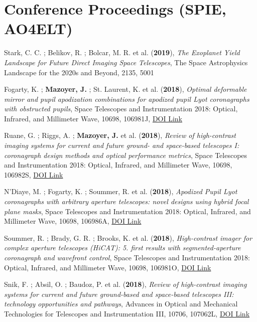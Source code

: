 \documentclass[11pt]{article}
\begin{document}
\section*{Conference Proceedings (SPIE, AO4ELT)}

\begin{etaremune}\itemsep 0pt


\item Stark, C. C. ; Belikov, R. ; Bolcar, M. R. et al. ({\bf2019}), {\it The Exoplanet Yield Landscape for Future Direct Imaging Space Telescopes}, The Space Astrophysics Landscape for the 2020s and Beyond, 2135, 5001

\item Fogarty, K. ; {\bf Mazoyer, J.} ; St. Laurent, K. et al. ({\bf2018}), {\it Optimal deformable mirror and pupil apodization combinations for apodized pupil Lyot coronagraphs with obstructed pupils}, Space Telescopes and Instrumentation 2018: Optical, Infrared, and Millimeter Wave, 10698, 106981J, \href{https://doi.org/10.1117/12.2314394}{DOI Link}

\item Ruane, G. ; Riggs, A. ; {\bf Mazoyer, J.} et al. ({\bf2018}), {\it Review of high-contrast imaging systems for current and future ground- and space-based telescopes I: coronagraph design methods and optical performance metrics}, Space Telescopes and Instrumentation 2018: Optical, Infrared, and Millimeter Wave, 10698, 106982S, \href{https://doi.org/10.1117/12.2312948}{DOI Link}

\item N'Diaye, M. ; Fogarty, K. ; Soummer, R. et al. ({\bf2018}), {\it Apodized Pupil Lyot coronagraphs with arbitrary aperture telescopes: novel designs using hybrid focal plane masks}, Space Telescopes and Instrumentation 2018: Optical, Infrared, and Millimeter Wave, 10698, 106986A, \href{https://doi.org/10.1117/12.2313225}{DOI Link}

\item Soummer, R. ; Brady, G. R. ; Brooks, K. et al. ({\bf2018}), {\it High-contrast imager for complex aperture telescopes (HiCAT): 5. first results with segmented-aperture coronagraph and wavefront control}, Space Telescopes and Instrumentation 2018: Optical, Infrared, and Millimeter Wave, 10698, 106981O, \href{https://doi.org/10.1117/12.2314110}{DOI Link}

\item Snik, F. ; Absil, O. ; Baudoz, P. et al. ({\bf2018}), {\it Review of high-contrast imaging systems for current and future ground-based and space-based telescopes III: technology opportunities and pathways}, Advances in Optical and Mechanical Technologies for Telescopes and Instrumentation III, 10706, 107062L, \href{https://doi.org/10.1117/12.2313957}{DOI Link}


\end{etaremune}
\end{document}
